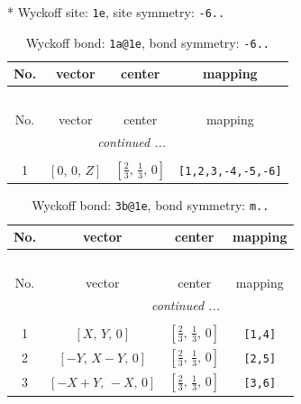 \documentclass[fleqn,8pt]{jsarticle}
\begin{document}
* Wyckoff site: {\tt 1e}, site symmetry: {\tt -6..}
\renewcommand{\arraystretch}{1.2}
\begin{longtable}{cccc}
\caption{Wyckoff bond: {\tt 1a@1e}, bond symmetry: {\tt -6..}}
 \\
 \hline \hline
No. & vector & center & mapping \\ \hline \endfirsthead

\multicolumn{3}{l}{\tablename\ \thetable{}} \\
 \hline \hline
No. & vector & center & mapping \\ \hline \endhead

 \hline \hline
\multicolumn{3}{r}{\footnotesize\it continued ...} \\ \endfoot

 \hline \hline
\multicolumn{3}{r}{} \\ \endlastfoot

1 & $\left[ 0,\, 0,\, Z \right]$ & $\left[ \frac{2}{3},\, \frac{1}{3},\, 0 \right]$ & {\tt [1,2,3,-4,-5,-6]} \\
\end{longtable}
\renewcommand{\arraystretch}{1.2}
\begin{longtable}{cccc}
\caption{Wyckoff bond: {\tt 3b@1e}, bond symmetry: {\tt m..}}
 \\
 \hline \hline
No. & vector & center & mapping \\ \hline \endfirsthead

\multicolumn{3}{l}{\tablename\ \thetable{}} \\
 \hline \hline
No. & vector & center & mapping \\ \hline \endhead

 \hline \hline
\multicolumn{3}{r}{\footnotesize\it continued ...} \\ \endfoot

 \hline \hline
\multicolumn{3}{r}{} \\ \endlastfoot

1 & $\left[ X,\, Y,\, 0 \right]$ & $\left[ \frac{2}{3},\, \frac{1}{3},\, 0 \right]$ & {\tt [1,4]} \\ \hline
2 & $\left[ - Y,\, X - Y,\, 0 \right]$ & $\left[ \frac{2}{3},\, \frac{1}{3},\, 0 \right]$ & {\tt [2,5]} \\ \hline
3 & $\left[ - X + Y,\, - X,\, 0 \right]$ & $\left[ \frac{2}{3},\, \frac{1}{3},\, 0 \right]$ & {\tt [3,6]} \\
\end{longtable}
\renewcommand{\arraystretch}{1.2}
\end{document}
